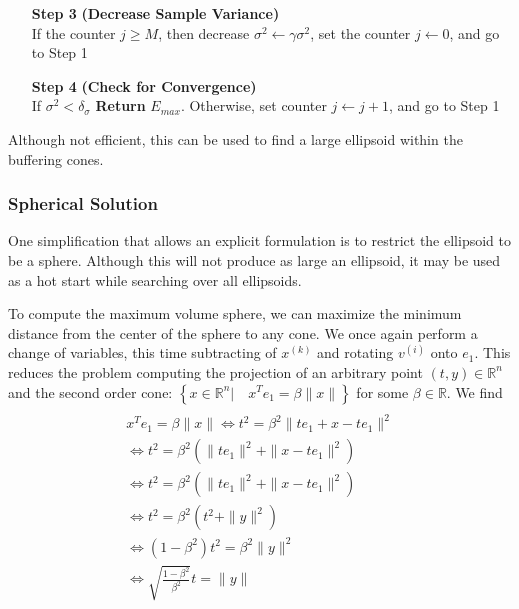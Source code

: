 \documentclass{article}
\theoremstyle{case}
\numberwithin{theorem}{subsection}
\newcommand{\reals}{\mathbb R}
\newcommand{\Rn}{\mathbb R^n}
\newcommand{\xk}{x^{(k)}}
\begin{document}
\begin{algorithm}[H]
\begin{itemize}
        \item[\textbf{Step 3}] \textbf{(Decrease Sample Variance)} \\
            If the counter $j \ge M$, then
	    	decrease $\sigma^2 \gets \gamma \sigma^2$,
	    	set the counter $j\gets 0$, and
	    	go to Step 1
            
        \item[\textbf{Step 4}] \textbf{(Check for Convergence)} \\
	    If $\sigma^2 < \delta_{\sigma}$ \textbf{Return} $E_{max}$.
	    Otherwise, 
        		set counter $j \gets j + 1$, and
        		go to Step 1
    \end{itemize}
\end{algorithm}

Although not efficient, this can be used to find a large ellipsoid within the buffering cones.


\subsubsection{Spherical Solution}

One simplification that allows an explicit formulation is to restrict the ellipsoid to be a sphere.
Although this will not produce as large an ellipsoid, it may be used as a hot start while searching over all ellipsoids.

To compute the maximum volume sphere, we can maximize the minimum distance from the center of the sphere to any cone.
We once again perform a change of variables, this time subtracting of $\xk$ and rotating $v^{(i)}$ onto $e_1$.
This reduces the problem computing the projection of an arbitrary point $(t, y) \in \Rn$ and the second order cone: $\left\{ x \in \mathbb R^n | \quad x^Te_1 = \beta \|x\| \right\}$ for some $\beta \in \reals$.
We find
\begin{align*}
 \\
x^Te_1 = \beta \|x\| 
 \Longleftrightarrow t^2 = \beta^2 \|te_1  + x - t e_1\|^2 \\
 \Longleftrightarrow t^2 = \beta^2 \left(\|te_1\|^2  + \|x - t e_1\|^2\right) \\
 \Longleftrightarrow t^2 = \beta^2 \left(\|te_1\|^2  + \|x - t e_1\|^2\right) \\
 \Longleftrightarrow t^2 = \beta^2 \left(t^2  + \|y\|^2 \right) \\
 \Longleftrightarrow (1 - \beta^2)t^2 = \beta^2 \|y\|^2 \\
 \Longleftrightarrow \sqrt{\frac{1 - \beta^2}{ \beta^2}} t = \|y\|
\end{align*}
\end{document}
